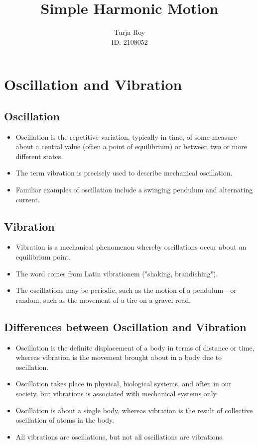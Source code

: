 \documentclass[12pt]{article}
\title{
    \textbf{Simple Harmonic Motion}
}
\author{
    Turja Roy\\
    ID: 2108052
}
\date{}
\numberwithin{equation}{subsection}
\begin{document}
\maketitle
\tableofcontents
\newpage

\section{Oscillation and Vibration}
\subsection{Oscillation}
\begin{itemize}
    \item Oscillation is the repetitive variation, typically in time, of some measure about a central value (often a point of equilibrium) or between two or more different states.
    \item The term vibration is precisely used to describe mechanical oscillation.
    \item Familiar examples of oscillation include a swinging pendulum and alternating current.
\end{itemize}

\subsection{Vibration}
\begin{itemize}
    \item Vibration is a mechanical phenomenon whereby oscillations occur about an equilibrium point.
    \item The word comes from Latin vibrationem ("shaking, brandishing").
    \item The oscillations may be periodic, such as the motion of a pendulum—or random, such as the movement of a tire on a gravel road.
\end{itemize}

\subsection{Differences between Oscillation and Vibration}
\begin{itemize}
    \item Oscillation is the definite displacement of a body in terms of distance or time, whereas vibration is the movement brought about in a body due to oscillation.
    \item Oscillation takes place in physical, biological systems, and often in our society, but vibrations is associated with mechanical systems only.
    \item Oscillation is about a single body, whereas vibration is the result of collective oscillation of atoms in the body.
    \item All vibrations are oscillations, but not all oscillations are vibrations.
\end{itemize}
\end{document}
